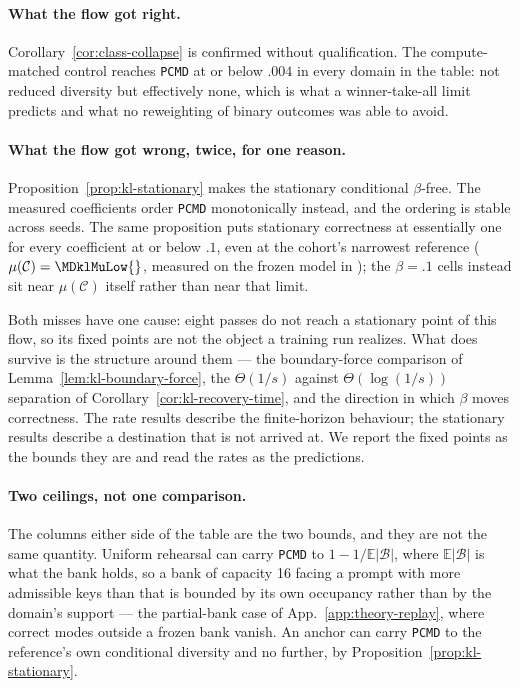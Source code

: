 \documentclass{article}
\newcommand{\1}{\mathbf 1}
\newcommand{\E}{\mathbb E}
\newcommand{\pmd}{\texttt{PCMD}}
\theoremstyle{remark}
\theoremstyle{definition}
\theoremstyle{plain}
\begin{document}
\paragraph{What the flow got right.}
Corollary~\ref{cor:class-collapse} is confirmed without qualification. The
compute-matched control reaches \pmd{} at or below $.004$ in every domain in
the table: not reduced diversity but effectively none, which is what a
winner-take-all limit predicts and what no reweighting of binary outcomes was
able to avoid.

\paragraph{What the flow got wrong, twice, for one reason.}
Proposition~\ref{prop:kl-stationary} makes the stationary conditional
$\beta$-free. The measured coefficients order \pmd{} monotonically instead, and
the ordering is stable across seeds. The same proposition puts stationary
correctness at essentially one for every coefficient at or below $.1$, even at
the cohort's narrowest reference ($\mu(\mathcal C)=\MDklMuLow{}$, measured on
the frozen model in \MDklMuLowDomain{}); the $\beta=.1$ cells instead sit near
$\mu(\mathcal C)$ itself rather than near that limit.

Both misses have one cause: eight passes do not reach a stationary point of
this flow, so its fixed points are not the object a training run realizes. What
does survive is the structure around them --- the boundary-force comparison of
Lemma~\ref{lem:kl-boundary-force}, the $\Theta(1/s)$ against
$\Theta(\log(1/s))$ separation of Corollary~\ref{cor:kl-recovery-time}, and the
direction in which $\beta$ moves correctness. The rate results describe the
finite-horizon behaviour; the stationary results describe a destination that is
not arrived at. We report the fixed points as the bounds they are and read the
rates as the predictions.

\paragraph{Two ceilings, not one comparison.}
The columns either side of the table are the two bounds, and they are not the
same quantity. Uniform rehearsal can carry \pmd{} to $1-1/\E|\mathcal B|$,
where $\E|\mathcal B|$ is what the bank holds, so a bank of capacity 16 facing
a prompt with more admissible keys than that is bounded by its own occupancy
rather than by the domain's support --- the partial-bank case of
App.~\ref{app:theory-replay}, where correct modes outside a frozen bank vanish.
An anchor can carry \pmd{} to the reference's own conditional diversity and no
further, by Proposition~\ref{prop:kl-stationary}.
\end{document}

